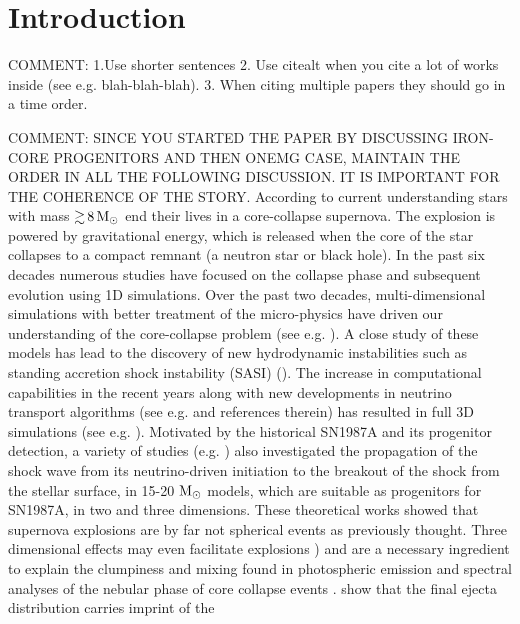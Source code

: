 \documentclass[fleqn,usenatbib]{mnras}
\newcommand{\solm}{\ensuremath{\rm{M_{\odot}}}\xspace}
\newcommand{\NY}[2]{{\color{blue}\sout{#1}#2}}
\begin{document}
\section{Introduction}
\NY{}{COMMENT: 1.Use shorter sentences 2. Use citealt when you cite a lot of works inside (see e.g. blah-blah-blah). 3. When citing multiple papers they should go in a time order.}

\NY{}{COMMENT: SINCE YOU STARTED THE PAPER BY DISCUSSING IRON-CORE PROGENITORS AND THEN ONEMG CASE, MAINTAIN THE ORDER IN ALL THE FOLLOWING DISCUSSION. IT IS IMPORTANT FOR THE COHERENCE OF THE STORY.}
According to current understanding stars with mass $\mathord{\gtrsim}\,8\, \solm$ end their lives in a core-collapse supernova. The explosion is powered by gravitational energy, which is released when the core of the star collapses to a compact remnant (a neutron star or black hole). In the past six decades numerous studies have focused on the collapse phase and subsequent evolution using 1D simulations. Over the past two decades, multi-dimensional simulations with better treatment of the micro-physics have driven our understanding of the core-collapse problem (see e.g. \citealt{Janka2012,Burrows2013,Janka2016}). A close study of these models has lead to the discovery of new hydrodynamic instabilities such as standing accretion shock instability (SASI) (\citealt{Blondin2003,Foglizzo2007}). The increase in computational capabilities in the recent years along with new developments in neutrino transport algorithms (see e.g. \citealt{Sumiyoshi2012,Sumiyoshi2015,Glas2019} and references therein) has resulted in full 3D simulations (see e.g. \citealt{Melson2015a,Summa2016,Vartanyan2018,Melson2019,Vartanyan2019}). Motivated by the historical SN1987A and its progenitor detection, a variety of studies (e.g. \citealt{Mueller1991,Kifonidis2003,Hammer2010,Wongwathanarat2015}) also investigated the propagation of the shock wave from its neutrino-driven initiation to the breakout of the shock from the stellar surface, in 15-20 $\solm$ models, which are suitable as progenitors for SN1987A, in two and three dimensions. 
These theoretical works showed that supernova explosions are by far not spherical events as previously thought. Three dimensional effects may even facilitate explosions \citep{Herant1994a,Burrows1995,Janka1996,Melson2015a,Mueller2017}) and are a necessary ingredient to explain the clumpiness and mixing found in photospheric emission \citep{Utrobin2015,Utrobin2017} and spectral analyses of the nebular phase of core collapse events \citep{Jerkstrand2017}. 
\citet{Wongwathanarat2015} show that the final ejecta distribution carries imprint of the 
\end{document}
